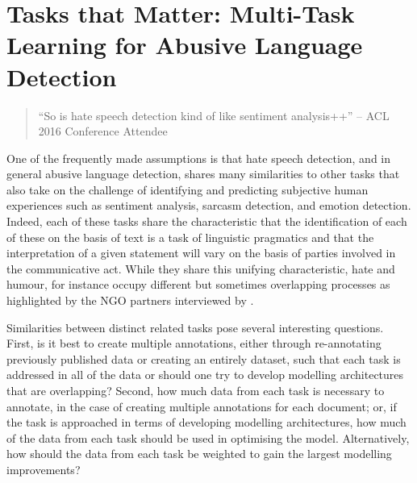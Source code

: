 \ifpdf
    \graphicspath{{Chapter6/Figs/Raster/}{Chapter6/Figs/PDF/}{Chapter6/Figs/}}
\else
    \graphicspath{{Chapter6/Figs/Vector/}{Chapter6/Figs/}}
\fi

\chapter[Tasks that Matter: Multi-Task Learning for Abusive Language Detection]{Tasks that Matter: Multi-Task Learning for Abusive Language Detection\footnotemark{}}\label{chap:mtl}

\begin{quote}
  ``So is hate speech detection kind of like sentiment analysis++'' -- ACL 2016 Conference Attendee
\end{quote}

One of the frequently made assumptions is that hate speech detection, and in general abusive language detection, shares many similarities to other tasks that also take on the challenge of identifying and predicting subjective human experiences such as sentiment analysis, sarcasm detection, and emotion detection.
Indeed, each of these tasks share the characteristic that the identification of each of these on the basis of text is a task of linguistic pragmatics and that the interpretation of a given statement will vary on the basis of parties involved in the communicative act.
While they share this unifying characteristic, hate and humour, for instance occupy different but sometimes overlapping processes as highlighted by the NGO partners interviewed by \citet{Rottger:2021}.

Similarities between distinct related tasks pose several interesting questions.
First, is it best to create multiple annotations, either through re-annotating previously published data or creating an entirely dataset, such that each task is addressed in all of the data or should one try to develop modelling architectures that are overlapping?
Second, how much data from each task is necessary to annotate, in the case of creating multiple annotations for each document; or, if the task is approached in terms of developing modelling architectures, how much of the data from each task should be used in optimising the model.
Alternatively, how should the data from each task be weighted to gain the largest modelling improvements?

